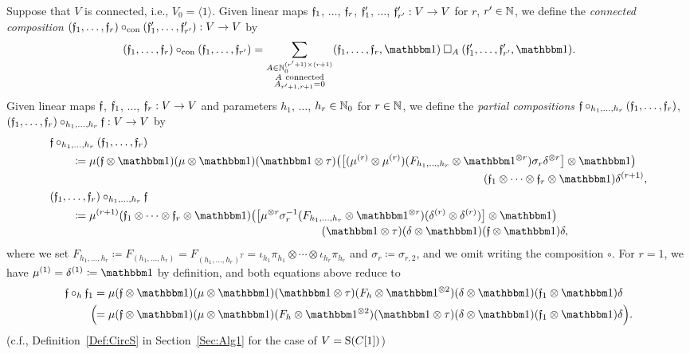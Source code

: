 \documentclass[\MainFolder/Text.tex]{subfiles}
\begin{document}
\begin{Definition}
Suppose that $V$ is connected, i.e., $V_0 = \langle 1\rangle$. Given linear maps $\mathfrak{f}_1$, $\dotsc$, $\mathfrak{f}_r$, $\mathfrak{f}_1'$, $\dotsc$, $\mathfrak{f}_{r'}': V\rightarrow V$ for $r$, $r'\in \mathbb{N}$, we define the \emph{connected composition} $(\mathfrak{f}_1, \dotsc, \mathfrak{f}_r)\circ_{\mathrm{con}}(\mathfrak{f}_1',\dotsc,\mathfrak{f}_{r'}'): V \rightarrow V$ by
\[ (\MVMorF_1, \dotsc, \MVMorF_r)\circ_{\mathrm{con}}(\MVMorF_1,\dotsc,\MVMorF_{r'}) = \sum_{\substack{A\in \N_0^{(r'+1)\times (r+1)}\\ A\  \mathrm{connected} \\ A_{r'+1,r+1} = 0 }} (\MVMorF_1,\dotsc,\MVMorF_r,\Id)\SquareComp_A (\MVMorF_1',\dotsc,\MVMorF_{r'}',\Id).\]
Given linear maps $\mathfrak{f}$, $\mathfrak{f}_1$, $\dotsc$, $\mathfrak{f}_r: V \rightarrow V$ and parameters $h_1$, $\dotsc$, $h_r\in \mathbb{N}_0$ for $r\in \mathbb{N}$, we define the \emph{partial compositions} $\mathfrak{f}\circ_{h_1, \dotsc, h_r}(\mathfrak{f}_1, \dotsc, \mathfrak{f}_r)$, $(\mathfrak{f}_1, \dotsc, \mathfrak{f}_r)\circ_{h_1, \dotsc, h_r}\mathfrak{f}: V\rightarrow V$ by
\begin{align*}
&\MVMorF\circ_{h_1, \dotsc, h_r}(\MVMorF_1, \dotsc, \MVMorF_r) \\
&\qquad\coloneqq\begin{multlined}[t]\MVProd(\MVMorF\otimes \Id)(\MVProd\otimes\Id)(\Id\otimes \tau)\bigl(\bigl[(\MVProd^{(r)}\otimes \MVProd^{(r)})(F_{h_1,\dotsc,h_r} \otimes \Id^{\otimes r})\sigma_r\MVCoProd^{\otimes r}\bigr] \otimes \Id \bigr)\\(\MVMorF_1\otimes \dotsb \otimes \MVMorF_r\otimes \Id)\MVCoProd^{(r+1)},\end{multlined}\\
&(\MVMorF_1, \dotsc, \MVMorF_r)\circ_{h_1, \dotsc, h_r}\MVMorF\\
&\qquad\coloneqq\begin{multlined}[t]\MVProd^{(r+1)}(\MVMorF_1\otimes\dotsb\otimes\MVMorF_r\otimes\Id) \bigl(\bigl[\MVProd^{\otimes r}\sigma_r^{-1}(F_{h_1,\dotsc,h_r}\otimes\Id^{\otimes r})(\MVCoProd^{(r)}\otimes\MVCoProd^{(r)})\bigr]\otimes\Id\bigr)\\(\Id\otimes\tau)(\MVCoProd\otimes\Id)(\MVMorF\otimes\Id)\MVCoProd,\end{multlined}
\end{align*}
where we set $F_{h_1,\dotsc, h_r} \coloneqq F_{(h_1,\dotsc,h_r)} = F_{(h_1,\dotsc,h_r)^T}=\iota_{h_1}\pi_{h_1} \otimes \dotsb \otimes \iota_{h_r}\pi_{h_r}$ and $\sigma_r \coloneqq \sigma_{r,2}$, and we omit writing the composition $\circ$. For $r=1$, we have $\MVProd^{(1)} = \MVCoProd^{(1)}\coloneqq \Id$ by definition, and both equations above reduce to 
\begin{align*}
\MVMorF \circ_h \MVMorF_1 &= \MVProd(\MVMorF\otimes \Id)(\MVProd\otimes\Id)(\Id\otimes\tau)(F_h\otimes\Id^{\otimes 2})(\MVCoProd\otimes \Id)(\MVMorF_1 \otimes \Id)\MVCoProd \\
\Bigl(\!\!&= \MVProd(\MVMorF\otimes \Id)(\MVProd\otimes\Id)(F_h\otimes\Id^{\otimes 2})(\Id\otimes\tau)(\MVCoProd\otimes \Id)(\MVMorF_1 \otimes \Id)\MVCoProd\Bigr).
\end{align*}
(c.f., Definition~\ref{Def:CircS} in Section~\ref{Sec:Alg1} for the case of $V = \mathrm{S}(C[1])$)
\end{Definition}
\end{document}
